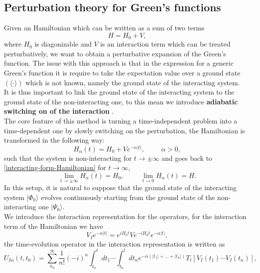\subsection{Perturbation theory for Green's functions}
Given an Hamiltonian which can be written as a sum of two terms
\begin{equation}
    H=H_0+V,
    \label{interacting-form-Hamiltonian}
\end{equation}
where $H_0$ is diagonizable and $V$ is an interaction term which can be treated perturbatively, we want to obtain a perturbative expansion 
of the Green's function. The issue with this approach is that in the expression for a generic Green's function it is require to take the expectation value  
over a ground state $(\langle \cdot \rangle)$ which is not known, namely the ground state of the interacting system.\\
It is thus important to link the ground state of the interacting system to the ground state of the non-interacting one, to this mean we 
introduce \textbf{adiabatic switching on of the interaction} \cite{nolting2009fundamentals}.\\
The core feature of this method is turning a time-independent problem into a time-dependent one by slowly switching on the perturbation, the Hamiltonian 
is transformed in the following way:
\begin{equation}
    H_\alpha(t)=H_0+Ve^{-\alpha|t|},\hspace{1cm}\alpha>0,
\end{equation}
such that the system is non-interacting for $t\to\pm\infty$ and goes back to \ref{interacting-form-Hamiltonian} for $t\to\infty$,
\begin{equation}
    \lim_{t\to\pm\infty}H_\alpha(t)=H_0,\hspace{1cm}\lim_{t\to 0}H_\alpha(t)=H.
\end{equation}
In this setup, it is natural to suppose that the ground state of the interacting system $|\Phi_0\rangle$ evolves continuously starting from 
the ground state of the non-interacting one $|\Psi_0\rangle$.\\
We introduce the interaction representation for the operators, for the interaction term of the Hamiltonian we have
\begin{equation}
    V_{I}e^{-\alpha |t|} = e^{iH_0t}Ve^{-iH_0t}e^{-\alpha|t|},
\end{equation}
the time-evolution operator in the interaction representation is written as
\begin{equation}
    U_{I\alpha}(t,t_0)=\sum_{n_0}^\infty \frac{1}{n!}(-i)^n \int_{t_0}^t dt_1\cdots\int_{t_0}^t dt_n e^{-\alpha(|t_1|+...+|t_n|)}T_t\left[V_I(t_1)\cdots V_I(t_n)\right],
    \label{t-evolution-perturbatively}
\end{equation}
